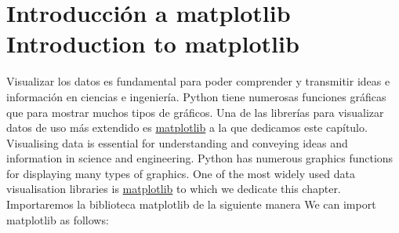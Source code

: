 \chapter{Introducción a matplotlib\\ Introduction to matplotlib}
\begin{paracol}{2}
    Visualizar los datos es fundamental para poder comprender y transmitir ideas e información en ciencias e ingeniería.
    Python tiene numerosas funciones gráficas que para mostrar muchos tipos de gráficos. Una de las librerías para visualizar datos de uso más extendido es \href{https://matplotlib.org/stable/}{matplotlib} a la que dedicamos este capítulo.
    \switchcolumn
    Visualising data is essential for understanding and conveying ideas and information in science and engineering.
    Python has numerous graphics functions for displaying many types of graphics. One of the most widely used data visualisation libraries is \href{https://matplotlib.org/stable/}{matplotlib} to which we dedicate this chapter.
    \switchcolumn
    Importaremos la biblioteca matplotlib de la siguiente manera
    \switchcolumn
    We can import matplotlib as follows:
\end{paracol}

